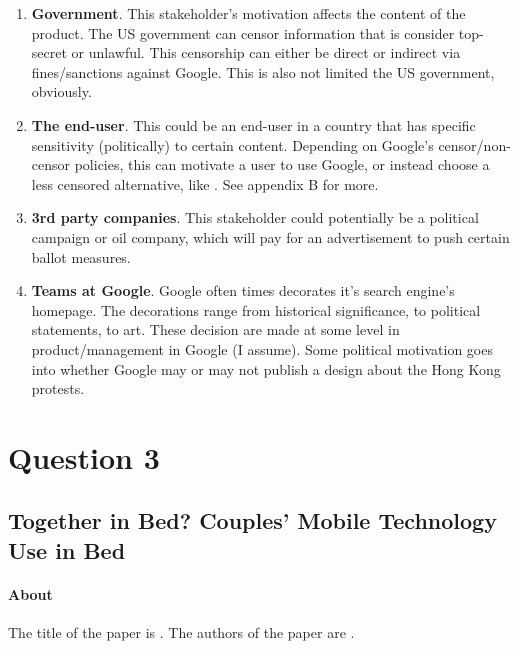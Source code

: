 \begin{enumerate}
\item
  \textbf{Government}. This stakeholder's motivation affects the content of the product. The US government can censor information that is consider top-secret or unlawful. This censorship can either be direct or indirect via fines/sanctions against Google. This is also not limited the US government, obviously.
\item
  \textbf{The end-user}. This could be an end-user in a country that has specific sensitivity (politically) to certain content. Depending on Google's censor/non-censor policies, this can motivate a user to use Google, or instead choose a less censored alternative, like . See appendix B for more.
\item
  \textbf{3rd party companies}. This stakeholder could potentially be a political campaign or oil company, which will pay for an advertisement to push certain ballot measures.
\item
  \textbf{Teams at Google}. Google often times decorates it's search engine's homepage. The decorations range from historical significance, to political statements, to art. These decision are made at some level in product/management in Google (I assume). Some political motivation goes into whether Google may or may not publish a design about the Hong Kong protests.
\end{enumerate}

\section{Question 3}

\subsection{Together in Bed? Couples’ Mobile Technology Use in Bed}

\paragraph{About}
The title of the paper is . The authors of the paper are .

